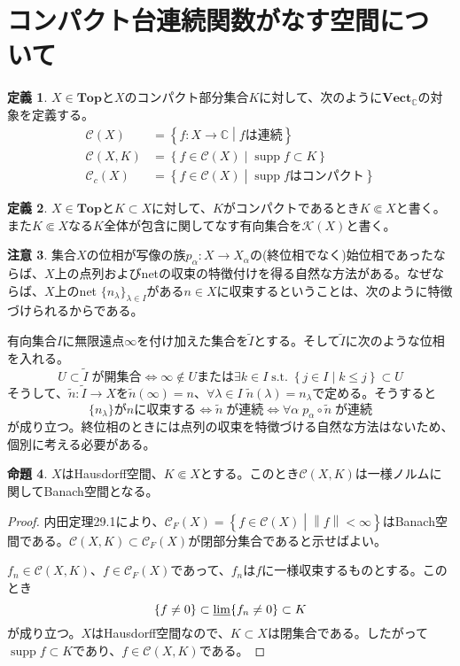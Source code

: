 ﻿\documentclass[12pt]{jsarticle}
\newcommand{\C}{\mathbb{C}}
\newcommand{\Top}{\textbf{Top}}
\newcommand{\Vect}{\textbf{Vect}_{\C}}
\newcommand{\CX}{\mathcal{C}(X)}%
\newcommand{\CCX}{\mathcal{C}_c(X)}%
\newcommand{\CXK}{\mathcal{C}(X,K)}%
\newcommand{\KX}{\mathcal{K}(X)}%
\newcommand{\setmid}[2]{\left\{ #1 \mathrel{} \middle| \mathrel{} #2 \right\}}%
\newcommand{\norm}[1]{\left \lVert #1 \right \rVert}%
\DeclareMathOperator{\supp}{supp}
\theoremstyle{definition}%
\newtheorem{definition}{定義}[section]%
\newtheorem{proposition}[definition]{命題}
\newtheorem{remark}[definition]{注意}
\renewenvironment{leftbar}{%
  \renewcommand\FrameCommand{\vrule width 1pt \hspace{10pt}}%
  \MakeFramed {\advance\hsize-\width \FrameRestore}}
 {\endMakeFramed}
\newenvironment{bardefinition}{ \begin{definition} \begin{leftbar}} {\end{leftbar} \end{definition}}
\begin{document}
\newpage
\section{コンパクト台連続関数がなす空間について}

\begin{bardefinition}
$X \in \Top$と$X$のコンパクト部分集合$K$に対して、次のように$\Vect$の対象を定義する。
\begin{align*}
  \CX &= \setmid{f \colon X \to \C}{f \text{は連続}} \\
  \CXK &= \setmid{f \in \CX }{\supp f \subset K} \\
  \CCX &= \setmid{f \in \CX}{\supp f \text{はコンパクト}}
\end{align*}
\end{bardefinition}

\begin{bardefinition}
  $X \in \Top$と$K \subset X$に対して、$K$がコンパクトであるとき$K \Subset X$と書く。また$K \Subset X$なる$K$全体が包含に関してなす有向集合を$\KX$と書く。
\end{bardefinition}

\begin{remark}
  集合$X$の位相が写像の族$p_{\alpha} \colon X \to X_{\alpha}$の(終位相でなく)始位相であったならば、$X$上の点列およびnetの収束の特徴付けを得る自然な方法がある。なぜならば、$X$上のnet $\{n_{\lambda}\}_{\lambda \in I}$がある$n \in X$に収束するということは、次のように特徴づけられるからである。

  有向集合$I$に無限遠点$\infty$を付け加えた集合を$\widetilde{I}$とする。そして$\widetilde{I}$に次のような位相を入れる。
  \[
  U \subset \widetilde{I} \; \text{が開集合} \Leftrightarrow \infty \not\in U \text{または} \exists k \in I \; \text{s.t.} \; \setmid{j \in I}{k \leq j} \subset U
  \]
  そうして、$\widetilde{n} \colon \widetilde{I} \to X$を$\widetilde{n}(\infty)=n$、$\forall \lambda  \in I \; \widetilde{n}(\lambda)=n_{\lambda}$で定める。そうすると
  \[
\{n_{\lambda} \} \text{が} n \text{に収束する} \Leftrightarrow \widetilde{n} \; \text{が連続} \Leftrightarrow \forall \alpha \; p_{\alpha} \circ \widetilde{n} \; \text{が連続}
  \]
  が成り立つ。終位相のときには点列の収束を特徴づける自然な方法はないため、個別に考える必要がある。
\end{remark}


\begin{proposition}
$X$はHausdorff空間、$K \Subset X$とする。このとき$\CXK$は一様ノルムに関してBanach空間となる。
\end{proposition}
\begin{proof}
  内田\cite{内田}定理29.1により、$\mathcal{C}_F(X)=\setmid{f\in \CX}{\norm{f} < \infty}$はBanach空間である。$\CXK \subset \mathcal{C}_F(X)$が閉部分集合であると示せばよい。

  $f_n \in \CXK$、$f \in \mathcal{C}_F(X)$であって、$f_n$は$f$に一様収束するものとする。このとき
  \[
  \{ f \neq 0\} \subset \varliminf \{ f_n \neq 0 \} \subset K
  \]
が成り立つ。$X$はHausdorff空間なので、$K \subset X$は閉集合である。したがって$\supp f \subset K$であり、$f \in \CXK$である。
\end{proof}
\end{document}
